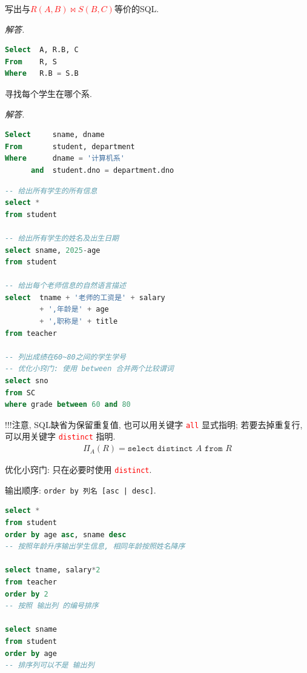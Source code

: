 \begin{example}
  写出与\textcolor{red}{$R(A,B) \bowtie S(B,C)$}等价的SQL.
\end{example}

\textit{ 解答. }
\begin{lstlisting}[language=SQL]
Select  A, R.B, C
From    R, S
Where   R.B = S.B
\end{lstlisting}

\begin{example}
  寻找每个学生在哪个系.
\end{example}

\textit{ 解答. }
\begin{lstlisting}[language=SQL]
Select     sname, dname
From       student, department
Where      dname = '计算机系'
      and  student.dno = department.dno
\end{lstlisting}

\begin{lstlisting}[language=SQL]
-- 给出所有学生的所有信息
select *
from student

-- 给出所有学生的姓名及出生日期
select sname, 2025-age
from student

-- 给出每个老师信息的自然语言描述
select  tname + '老师的工资是' + salary
        + ',年龄是' + age
        + ',职称是' + title
from teacher

-- 列出成绩在60~80之间的学生学号
-- 优化小窍门: 使用 between 合并两个比较谓词
select sno
from SC
where grade between 60 and 80
\end{lstlisting}

!!!注意, SQL缺省为保留重复值, 也可以用关键字 \textcolor{red}{\texttt{all}} 显式指明; 若要去掉重复行, 可以用关键字 \textcolor{red}{\texttt{distinct}} 指明.
\begin{align*}
    \Pi_A(R) = \texttt{select distinct }A\texttt{ from }R
\end{align*}

优化小窍门: 只在必要时使用 \textcolor{red}{\texttt{distinct}}.

输出顺序: \texttt{order by 列名 [asc | desc]}.
\begin{lstlisting}[language=SQL]
select *
from student
order by age asc, sname desc
-- 按照年龄升序输出学生信息, 相同年龄按照姓名降序

select tname, salary*2
from teacher
order by 2
-- 按照 输出列 的编号排序

select sname
from student
order by age
-- 排序列可以不是 输出列
\end{lstlisting}

